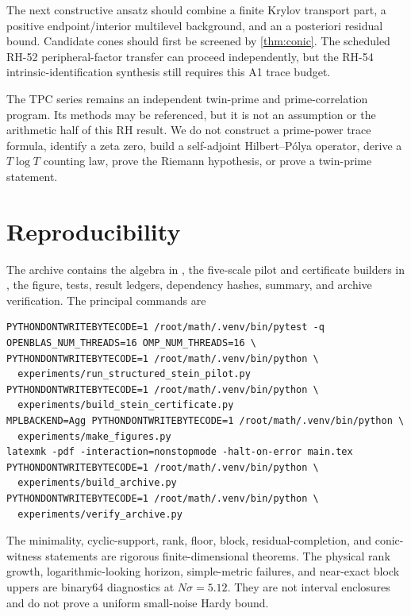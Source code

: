 \documentclass[11pt]{article}
\theoremstyle{definition}
\theoremstyle{remark}
\begin{document}
The next constructive ansatz should combine a finite Krylov transport part,
a positive endpoint/interior multilevel background, and an a posteriori
residual bound.  Candidate cones should first be screened by
\cref{thm:conic}.  The scheduled RH-52 peripheral-factor transfer can
proceed independently, but the RH-54 intrinsic-identification synthesis
still requires this A1 trace budget.

The TPC series remains an independent twin-prime and prime-correlation
program.  Its methods may be referenced, but it is not an assumption or
the arithmetic half of this RH result.  We do not construct a prime-power
trace formula, identify a zeta zero, build a self-adjoint Hilbert--P\'olya
operator, derive a \(T\log T\) counting law, prove the Riemann hypothesis,
or prove a twin-prime statement.

\section{Reproducibility}

The archive contains the algebra in , the
five-scale pilot and certificate builders in , the figure,
tests, result ledgers, dependency hashes, summary, and archive verification.
The principal commands are
\begin{verbatim}
PYTHONDONTWRITEBYTECODE=1 /root/math/.venv/bin/pytest -q
OPENBLAS_NUM_THREADS=16 OMP_NUM_THREADS=16 \
PYTHONDONTWRITEBYTECODE=1 /root/math/.venv/bin/python \
  experiments/run_structured_stein_pilot.py
PYTHONDONTWRITEBYTECODE=1 /root/math/.venv/bin/python \
  experiments/build_stein_certificate.py
MPLBACKEND=Agg PYTHONDONTWRITEBYTECODE=1 /root/math/.venv/bin/python \
  experiments/make_figures.py
latexmk -pdf -interaction=nonstopmode -halt-on-error main.tex
PYTHONDONTWRITEBYTECODE=1 /root/math/.venv/bin/python \
  experiments/build_archive.py
PYTHONDONTWRITEBYTECODE=1 /root/math/.venv/bin/python \
  experiments/verify_archive.py
\end{verbatim}

The minimality, cyclic-support, rank, floor, block, residual-completion,
and conic-witness statements are rigorous finite-dimensional theorems.
The physical rank growth, logarithmic-looking horizon, simple-metric
failures, and near-exact block uppers are binary64 diagnostics at
\(N\sigma=5.12\).  They are not interval enclosures and do not prove a
uniform small-noise Hardy bound.



\end{document}
